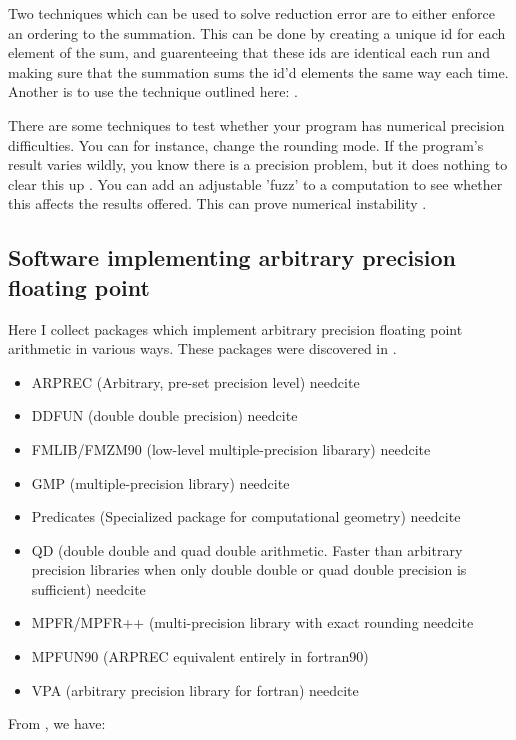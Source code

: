 \documentclass[american]{article}
\newcommand{\needcite}{
	\gls{needcite}
}
\begin{document}
Two techniques which can be used to solve reduction error are to either enforce an ordering to the summation. This can be done by creating a unique id for each element of the sum, and guarenteeing that these ids are identical each run and making sure that the summation sums the id'd elements the same way each time. Another is to use the technique outlined here: \cite{repro-fast-sum}.

There are some techniques to test whether your program has numerical precision difficulties. You can for instance, change the rounding mode. If the program's result varies wildly, you know there is a precision problem, but it does nothing to clear this up \cite{dhb-numerical-bugs}. You can add an adjustable 'fuzz' to a computation to see whether this affects the results offered. This can prove numerical instability \cite{dhb-numerical-bugs}.

\subsection{Software implementing arbitrary precision floating point}

Here I collect packages which implement arbitrary precision floating point arithmetic in various ways. These packages were discovered in \cite{high-precision-arith-in-science}.

\begin{itemize}
\item ARPREC (Arbitrary, pre-set precision level) \needcite
\item DDFUN (double double precision) \needcite
\item FMLIB/FMZM90 (low-level multiple-precision libarary) \needcite
\item GMP (multiple-precision library) \needcite
\item Predicates (Specialized package for computational geometry) \needcite
\item QD (double double and quad double arithmetic. Faster than arbitrary precision libraries when only double double or quad double precision is sufficient) \needcite
\item MPFR/MPFR++ (multi-precision library with exact rounding \needcite
\item MPFUN90 (ARPREC equivalent entirely in fortran90) \cite{mpfun}
\item VPA (arbitrary precision library for fortran) \needcite
\end{itemize}

From \cite{dhb-zurich-hp}, we have:
\end{document}
